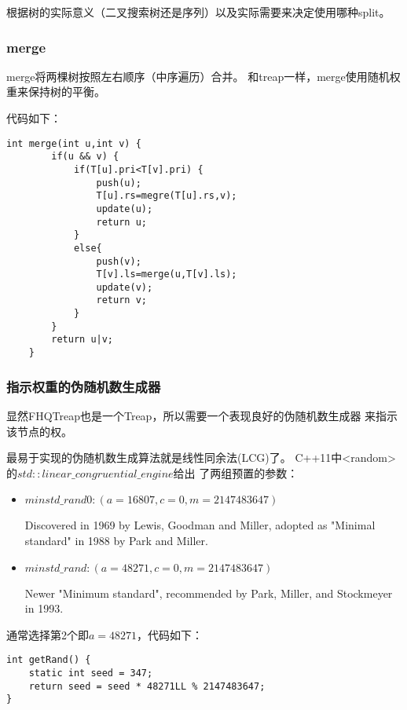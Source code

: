 根据树的实际意义（二叉搜索树还是序列）以及实际需要来决定使用哪种split。

\subsubsection{merge}

merge将两棵树按照左右顺序（中序遍历）合并。
和treap一样，merge使用随机权重来保持树的平衡。

代码如下：

\begin{lstlisting}[title=merge]
    int merge(int u,int v) {
        if(u && v) {
            if(T[u].pri<T[v].pri) {
                push(u);
                T[u].rs=megre(T[u].rs,v);
                update(u);
                return u;
            }
            else{
                push(v);
                T[v].ls=merge(u,T[v].ls);
                update(v);
                return v;
            }
        }
        return u|v;
    }
\end{lstlisting}

\subsubsection{指示权重的伪随机数生成器}\label{WRG}

显然FHQTreap也是一个Treap，所以需要一个表现良好的伪随机数生成器
来指示该节点的权。

最易于实现的伪随机数生成算法就是线性同余法(LCG)了。
C++11中<random>的$std::linear\_congruential\_engine$给出
了两组预置的参数：
\begin{itemize}
    \item $minstd\_rand0:(a=16807, c=0, m=2147483647)$

    Discovered in 1969 by Lewis, Goodman and Miller, adopted as
    "Minimal standard" in 1988 by Park and Miller.
    \item $minstd\_rand:(a=48271, c=0, m=2147483647)$

    Newer "Minimum standard", recommended by Park, Miller, and Stockmeyer in 1993.

\end{itemize}

通常选择第2个即$a=48271$，代码如下：

\begin{lstlisting}[title=minstd\_rand]
int getRand() {
    static int seed = 347;
    return seed = seed * 48271LL % 2147483647;
}
\end{lstlisting}


